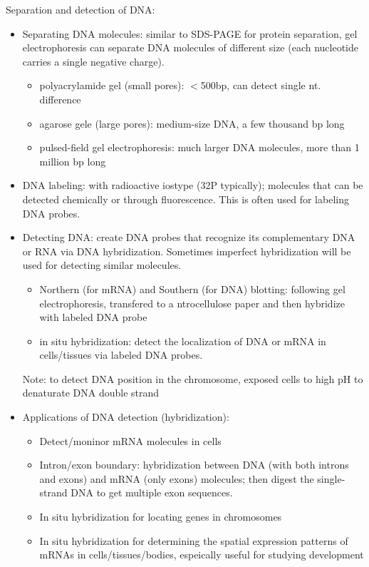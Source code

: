 \documentclass{report}
\begin{document}
Separation and detection of DNA: 
\begin{itemize}
\item Separating DNA molecules: similar to SDS-PAGE for protein separation, gel electrophoresis can separate DNA molecules of different size (each nucleotide carries a single negative charge). 
\begin{itemize}
\item polyacrylamide gel (small pores): $<$500bp, can detect single nt. difference
\item agarose gele (large pores): medium-size DNA, a few thousand bp long
\item pulsed-field gel electrophoresis: much larger DNA molecules, more than 1 million bp long
\end{itemize}
	
\item DNA labeling: with radioactive iostype (32P typically); molecules that can be detected chemically or through fluorescence. This is often used for labeling DNA probes. 
	
\item Detecting DNA: create DNA probes that recognize its complementary DNA or RNA via DNA hybridization. Sometimes imperfect hybridization will be used for detecting similar molecules.
\begin{itemize} 
	\item Northern (for mRNA) and Southern (for DNA) blotting: following gel electrophoresis, transfered to a ntrocellulose paper and then hybridize with labeled DNA probe
	\item in situ hybridization: detect the localization of DNA or mRNA in cells/tissues via labeled DNA probes. 
\end{itemize}
Note: to detect DNA position in the chromosome, exposed cells to high pH to denaturate DNA double strand

\item Applications of DNA detection (hybridization):
\begin{itemize}
	\item Detect/moninor mRNA molecules in cells
	\item Intron/exon boundary: hybridization between DNA (with both introns and exons) and mRNA (only exons) molecules; then digest the single-strand DNA to get multiple exon sequences. 
	\item In situ hybridization for locating genes in chromosomes
	\item In situ hybridization for determining the spatial expression patterns of mRNAs in cells/tissues/bodies, espeically useful for studying development
\end{itemize}
\end{itemize}
\end{document}
